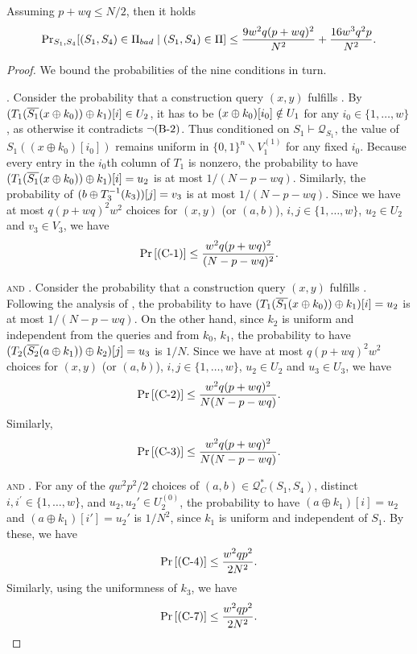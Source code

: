 \begin{lemma}
	\label{lemma:bad-outer-4-rounds}
	
	Assuming $p+wq\leq N/2$, then it holds
	\begin{align}
	 \operatorname{Pr}_{S_1,S_4}[(S_1,S_4) \in \emph{$\Pi_{bad}$}\mid (S_{1}, S_{4})\in\Pi]    
	\leq    \frac{9w^2 q (p+w q)^{2}}{N^2}+ \frac{16w^3q^2p}{N^2} .
	\label{eq:bound-bad-outer-4-rounds}
	\end{align}
\end{lemma}
\begin{proof}
We bound the probabilities of the nine conditions in turn.


\smallskip
\noindent \textsc{\cone}. Consider the probability that a construction query $(x,y)$ fulfills \cone. By $(T_1(\overline{S_1}(x\oplus k_0))\oplus k_1)[i]\in U_2$, it has to be $(x\oplus k_0)[i_0]\notin U_1$ for any $i_0\in\{1,\ldots,w\}$, as otherwise it contradicts $\neg\text{(B-2)}$. Thus conditioned on $S_{1} \vdash \mathcal{Q}_{S_{1}}$, the value of $S_1((x \oplus k_0)[i_0])$ remains uniform in $\{0, 1\}^{n} \backslash V_1^{(1)}$ for any fixed $i_0$. Because every entry in the $i_{0}$th column of $T_{1}$ is nonzero, the probability to have $(T_1(\overline{S_1}(x\oplus k_0))\oplus k_1)[i]=u_2$ is at most $1/(N-p-wq)$. Similarly, the probability of $(b\oplus T_{3}^{-1}(k_3))[j] = v_3$ is at most $1/(N-p-wq)$. Since we have at most $q(p+wq)^2w^2$ choices for $(x,y)$ (or $(a, b)$), $i, j \in\{1, \ldots, w\}$, $u_{2} \in U_{2}$ and $v_{3} \in V_{3}$, we have
%
%
$$
\operatorname{Pr}\left[\text{(C-1)}\right] \leq \frac{w^{2} q (p+w q)^{2}}{(N-p-wq)^{2}}.
$$



\smallskip
\noindent \textsc{\ctwo and \cthree}. Consider the probability that a construction query $(x,y)$ fulfills \ctwo. Following the analysis of \cone, the probability to have $(T_1(\overline{S_1}(x\oplus k_0))\oplus k_1)[i]=u_2$ is at most $1/(N-p-wq)$. On the other hand, since $k_{2}$ is uniform and independent from the queries and from $k_{0}$, $k_{1}$, the probability to have $(T_{2}(\overline{S_2}(a \oplus k_1))\oplus k_2)[j] = u_3$ is $1/N$. Since we have at most $q(p+wq)^2w^2$ choices for $(x,y)$ (or $(a, b)$), $i, j \in\{1, \ldots, w\}$, $u_{2} \in U_{2}$ and $u_{3} \in U_{3}$, we have
%
%
$$
\operatorname{Pr}\left[\text{(C-2)}\right] \leq \frac{w^{2} q (p+w q)^{2}}{N  (N-p-wq)}.
$$
%
Similarly,
%
$$
\operatorname{Pr}\left[\text{(C-3)}\right] \leq \frac{w^{2} q (p+w q)^{2}}{N  (N-p-wq)}.
$$




\smallskip
\noindent \textsc{\cfour and \cseven}. For any of the $qw^2p^2/2$ choices of $(a, b) \in \mathcal{Q}_{C}^{*}\left(S_{1}, S_{4}\right)$, distinct $i, i^{\prime}\in\{1, \ldots, w\}$, and $u_{2},u_{2}' \in U_{2}^{(0)}$, the probability to have $(a \oplus k_1)[i] = u_2$ and $(a \oplus k_1)[i'] = u_2'$ is $1/N^2$, since $k_1$ is uniform and independent of $S_1$. By these, we have
%
$$
\operatorname{Pr}\left[\text{(C-4)}\right] \leq \frac{w^2qp^2}{2N^2}.
$$
Similarly, using the uniformness of $k_3$, we have
%
$$
\operatorname{Pr}\left[\text{(C-7)}\right] \leq \frac{w^2qp^2}{2N^2}.
$$





\end{proof}
